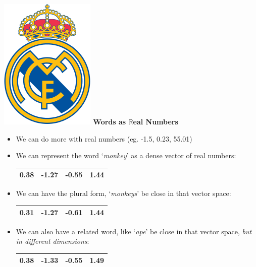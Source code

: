 \documentclass{beamer}
\newcommand{\pagestepalt}[2]{
  \begin{frame}[t]
    \begin{minipage}[t][0.26\textheight][t]{\textwidth}
      \begin{center}
        \huge
        \textbf{#1}
      \end{center}
    \end{minipage}
    
    \begin{minipage}[t][0.7\textheight][c]{\textwidth}
      #2
    \end{minipage}
  \end{frame}
}
\begin{document}
\pagestepalt{\includegraphics[width=0.06\textheight]{../images/real_madrid_cf.png} \hspace{1.5em} Words as $\mathbb{R}$eal Numbers}{
\begin{itemize}
	\item We can do more with real numbers (eg. -1.5, 0.23, 55.01)
	\pause
	\item We can represent the word `\textit{monkey}' as a dense vector of real numbers: \\[0.4em]
		\begin{tabular}{|c|c|c|c|}
		    \hline
			0.38 & -1.27 & -0.55 & 1.44 \\
		    \hline
		\end{tabular}
	\pause
	\item We can have the plural form, `\textit{monkeys}' be close in that vector space: \\[0.4em]
		\begin{tabular}{|c|c|c|c|}
		    \hline
			\bf 0.31 & -1.27 & \bf -0.61 & 1.44 \\
		    \hline
		\end{tabular}
	\pause
	\item We can also have a related word, like `\textit{ape}' be close in that vector space, \emph{but in different dimensions}: \\[0.4em]
		\begin{tabular}{|c|c|c|c|}
		    \hline
			0.38 & \bf -1.33 & -0.55 & \bf 1.49 \\
		    \hline
		\end{tabular}
\end{itemize}
}
\end{document}

